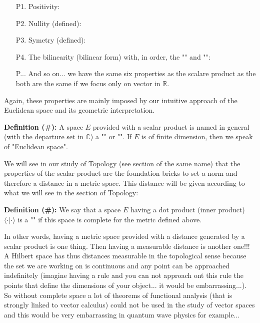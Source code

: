 	\begin{enumerate}
		\item[P1.] Positivity: 
		
	  	
	  	\item[P2.] Nullity (defined): 
	  	 
	  	
	  	\item[P3.] Symetry (defined): 
	  	
	  	
	  	\item[P4.] The bilinearity (bilinear form) with, in order, the "" and "":
	  	
		
		\item[P...] And so on... we have the same six properties as the scalare product as the both are the same if we focus only on vector in $\mathbb{R}$.
	\end{enumerate}
	\begin{tcolorbox}[title=Remark,colframe=black,arc=10pt]
	Again, these properties are mainly imposed by our intuitive approach of the Euclidean space and its geometric interpretation.
	\end{tcolorbox}	
	
	\textbf{Definition (\#\mydef):} A space $E$ provided with a scalar product is named in general (with the departure set in $\mathbb{C}$) a "" or "". If $E$ is of finite dimension, then we speak of "Euclidean space".
	
	We will see in our study of Topology (see section of the same name) that the properties of the scalar product are the foundation bricks to set a norm and therefore a distance in a metric space. This distance will be given according to what we will see in the section of Topology:
	
	
	\textbf{Definition (\#\mydef):} We say that a space $E$ having a dot product (inner product) $ \langle \cdot | \cdot \rangle$ is a "" if this space is complete for the metric defined above.
	
	In other words, having a metric space provided with a distance generated by a scalar product is one thing. Then having a measurable distance is another one!!! A Hilbert space has thus distances measurable in the topological sense because the set we are working on is continuous and any point can be approached indefinitely (imagine having a rule and you can not approach ont this rule the points that define the dimensions of your object... it would be embarrassing...). So without complete space a lot of theorems of functional analysis (that is strongly linked to vector calculus) could not be used in the study of vector spaces and this would be very embarrassing in quantum wave physics for example...
	
